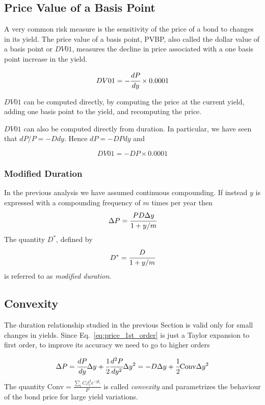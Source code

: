 \subsection{Price Value of a Basis Point}
A very common risk measure is the sensitivity of the price of a bond to changes in its yield. The price value of a basis point, PVBP, also called the dollar value of a basis point or $DV01$, measures the decline in price associated with a one basis point increase in the yield.

\begin{equation}
DV01 = -\cfrac{dP}{dy}\times 0.0001
\end{equation}

$DV01$ can be computed directly, by computing the price at the current yield, adding one basis point to the yield, and recomputing the price.

$DV01$ can also be computed directly from duration. In particular, we have seen that $dP/P = -D dy$. Hence $dP = -D Pdy$ and

\begin{equation}
DV01 = -D P \times 0.0001
\end{equation}

\subsubsection{Modified Duration}
In the previous analysis we have assumed continuous compounding. If instead $y$ is expressed with a compounding frequency of $m$ times per year then 
\begin{equation}
\Delta P = \cfrac{PD\Delta y}{1+y/m}
\end{equation}
\noindent
The quantity $D^{*}$, defined by
\begin{equation}
D^{*} = \cfrac{D}{1+y/m}
\end{equation}
\noindent
is referred to as \emph{modified duration}. 

\subsection{Convexity}
The duration relationship studied in the previous Section is valid only for small changes in yields. Since Eq.~\ref{eq:price_1st_order} is just a Taylor expansion to first order, to improve its accuracy we need to go to higher orders

\begin{equation}
\Delta P = \cfrac{dP}{dy}\Delta y + \cfrac{1}{2} \cfrac{d^2 P}{dy^2}\Delta y^2 = -D\Delta y + \cfrac{1}{2} \textrm{Conv} \Delta y^2 
\end{equation}
\noindent
The quantity $\textrm{Conv} = \frac{\sum_i C_i t_i^2 e^{-yt_i}}{P}$ is called \emph{convexity} and parametrizes the behaviour of the bond price for large yield variations.


